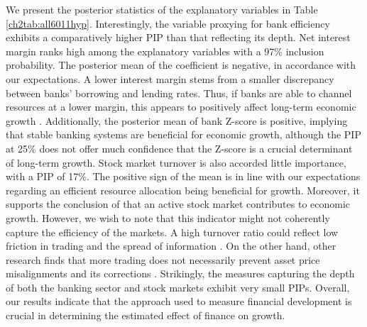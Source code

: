 \begin{refsection}
We present the posterior statistics of the explanatory variables in Table \ref{ch2tab:all6011hyp}. Interestingly, the variable proxying for bank efficiency exhibits a comparatively higher \ac{PIP} than that reflecting its depth. Net interest margin ranks high among the explanatory variables with a 97\% inclusion probability. The posterior mean of the coefficient is negative, in accordance with our expectations. A lower interest margin stems from a smaller discrepancy between banks' borrowing and lending rates. Thus, if banks are able to channel resources at a lower margin, this appears to positively affect long-term economic growth \parencite{Rousseau1998}. Additionally, the posterior mean of bank Z-score is positive, implying that stable banking systems are beneficial for economic growth, although the \ac{PIP} at 25\% does not offer much confidence that the Z-score is a crucial determinant of long-term growth. Stock market turnover is also accorded little importance, with a \ac{PIP} of 17\%. The positive sign of the mean is in line with our expectations regarding an efficient resource allocation being beneficial for growth. Moreover, it supports the conclusion of \textcite{LevineZervos1998} that an active stock market contributes to economic growth. However, we wish to note that this indicator might not coherently capture the efficiency of the markets. A high turnover ratio could reflect low friction in trading and the spread of information \parencite{Levine2005}. On the other hand, other research finds that more trading does not necessarily prevent asset price misalignments and its corrections \parencite{Brunnermeier2004}. Strikingly, the measures capturing the depth of both the banking sector and stock markets exhibit very small \acp{PIP}. Overall, our results indicate that the approach used to measure financial development is crucial in determining the estimated effect of finance on growth. 


\end{refsection}
